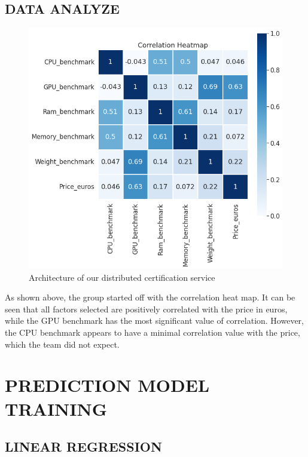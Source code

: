 \documentclass{scrartcl}
\begin{document}
\subsection{DATA ANALYZE}

\begin{figure}[H]
	\begin{center}
		\includegraphics[scale=0.4]{Graphics/4520 final/Heat_map.png}
	\end{center}
	\caption{Architecture of our distributed certification service}
	\label{fig:heat}
\end{figure}

As shown above, the group started off with the correlation heat map. It can be seen that all factors selected are positively correlated with the price in euros, while the GPU benchmark has the most significant value of correlation. However, the CPU benchmark appears to have a minimal correlation value with the price, which the team did not expect. 

\section{PREDICTION MODEL TRAINING}

\subsection{LINEAR REGRESSION}
\end{document}
